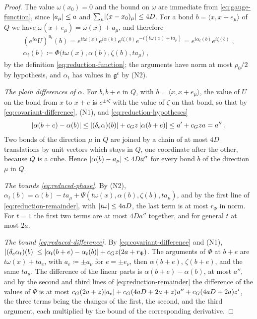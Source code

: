 \documentclass[11pt]{preprint}
\DeclarePairedDelimiter{\abs}{\lvert}{\rvert}
\numberwithin{equation}{section}
\theoremstyle{definition}
\theoremstyle{remark}
\theoremstyle{plain}
\begin{document}
\begin{proof}
The value $\omega(x_0) = 0$ and the bound on $\omega$ are immediate from \eqref{eq:gauge-function}, since $\abs{a_\mu} \leq a$ and $\sum_\mu\abs{(x - x_0)_\mu} \leq 4D$. For a bond $b = \langle x, x + e_\mu\rangle$ of $Q$ we have $\omega(x + e_\mu) = \omega(x) + a_\mu$, and therefore
\begin{gather*}
    (e^{i\alpha}U)^{u_t}(b) = e^{it\omega(x)}e^{i\alpha(b)}e^{i\zeta(b)}e^{-i(t\omega(x) + ta_\mu)} = e^{i\alpha_t(b)}e^{i\zeta(b)}\;,\\
    \alpha_t(b) \coloneqq \Phi\bigl(t\omega(x), \alpha(b), \zeta(b), ta_\mu\bigr)\;,
\end{gather*}
by the definition \eqref{eq:reduction-function}; the arguments have norm at most $\rho_0/2$ by hypothesis, and $\alpha_t$ has values in $\mathfrak g^c$ by (N2).

\emph{The plain differences of $\alpha$.} For $b, b + e$ in $Q$, with $b = \langle x, x + e_\mu\rangle$, the value of $U$ on the bond from $x$ to $x + e$ is $e^{\pm i\zeta}$ with the value of $\zeta$ on that bond, so that by \eqref{eq:covariant-difference}, (N1), and \eqref{eq:reduction-hypotheses}
\[
    \abs{\alpha(b + e) - \alpha(b)} \leq \abs{(\delta_e\alpha)(b)} + c_Gz\,\abs{\alpha(b + e)} \leq a' + c_Gza = a''\;.
\]
Two bonds of the direction $\mu$ in $Q$ are joined by a chain of at most $4D$ translations by unit vectors which stays in $Q$, one coordinate after the other, because $Q$ is a cube. Hence $\abs{\alpha(b) - a_\mu} \leq 4Da''$ for every bond $b$ of the direction $\mu$ in $Q$.

\emph{The bounds \eqref{eq:reduced-phase}.} By (N2), $\alpha_t(b) = \alpha(b) - ta_\mu + \Psi(t\omega(x), \alpha(b), \zeta(b), ta_\mu)$, and by the first line of \eqref{eq:reduction-remainder}, with $\abs{t\omega} \leq 4aD$, the last term is at most $r_\Phi$ in norm. For $t = 1$ the first two terms are at most $4Da''$ together, and for general $t$ at most $2a$.

\emph{The bound \eqref{eq:reduced-difference}.} By \eqref{eq:covariant-difference} and (N1), $\abs{(\delta_e\alpha_t)(b)} \leq \abs{\alpha_t(b + e) - \alpha_t(b)} + c_Gz(2a + r_\Phi)$. The arguments of $\Phi$ at $b + e$ are $t\omega(x) + ta_e$, with $a_e \coloneqq \pm a_\nu$ for $e = \pm e_\nu$, then $\alpha(b + e)$, $\zeta(b + e)$, and the same $ta_\mu$. The difference of the linear parts is $\alpha(b + e) - \alpha(b)$, at most $a''$, and by the second and third lines of \eqref{eq:reduction-remainder} the difference of the values of $\Psi$ is at most $c_G(2a + z)\abs{a_e} + c_G(4aD + 2a + z)a'' + c_G(4aD + 2a)z'$, the three terms being the changes of the first, the second, and the third argument, each multiplied by the bound of the corresponding derivative.
\end{proof}
\end{document}
